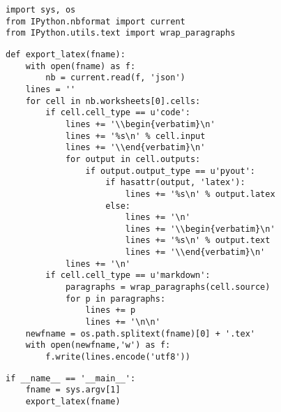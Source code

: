 \begin{verbatim}
import sys, os
from IPython.nbformat import current
from IPython.utils.text import wrap_paragraphs
\end{verbatim}

\begin{verbatim}
def export_latex(fname):
    with open(fname) as f:
        nb = current.read(f, 'json')
    lines = ''
    for cell in nb.worksheets[0].cells:
        if cell.cell_type == u'code':
            lines += '\\begin{verbatim}\n'
            lines += '%s\n' % cell.input
            lines += '\\end{verbatim}\n'
            for output in cell.outputs:
                if output.output_type == u'pyout':
                    if hasattr(output, 'latex'):
                        lines += '%
                    else:
                        lines += '\n'
                        lines += '\\begin{verbatim}\n'
                        lines += '%s\n' % output.text
                        lines += '\\end{verbatim}\n'
            lines += '\n'
        if cell.cell_type == u'markdown':
            paragraphs = wrap_paragraphs(cell.source)
            for p in paragraphs:
                lines += p
                lines += '\n\n'
    newfname = os.path.splitext(fname)[0] + '.tex'
    with open(newfname,'w') as f:
        f.write(lines.encode('utf8'))
\end{verbatim}

\begin{verbatim}
if __name__ == '__main__':
    fname = sys.argv[1]
    export_latex(fname)
\end{verbatim}

